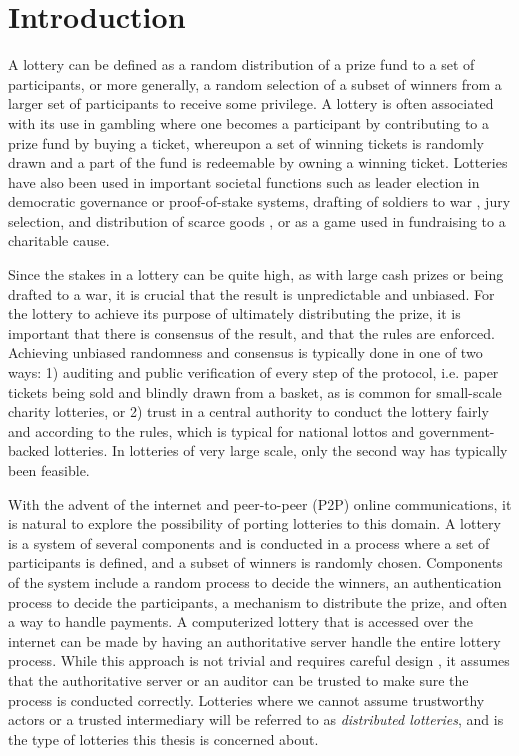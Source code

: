 \chapter{Introduction}
\label{chap:introduction}

A lottery can be defined as a random distribution of a prize fund to a set of participants, or more generally, a random selection of a subset of winners from a larger set of participants to receive some privilege. A lottery is often associated with its use in gambling where one becomes a participant by contributing to a prize fund by buying a ticket, whereupon a set of winning tickets is randomly drawn and a part of the fund is redeemable by owning a winning ticket. Lotteries have also been used in important societal functions such as leader election in democratic governance \cite{sintomer_random_2010} or proof-of-stake systems, drafting of soldiers to war \cite{nixon_executive_1969}, jury selection, and distribution of scarce goods \cite{the_economist_why_2018}, or as a game used in fundraising to a charitable cause. 

Since the stakes in a lottery can be quite high, as with large cash prizes or being drafted to a war, it is crucial that the result is unpredictable and unbiased. For the lottery to achieve its purpose of ultimately distributing the prize, it is important that there is consensus of the result, and that the rules are enforced. Achieving unbiased randomness and consensus is typically done in one of two ways: 1) auditing and public verification of every step of the protocol, i.e. paper tickets being sold and blindly drawn from a basket, as is common for small-scale charity lotteries, or 2) trust in a central authority to conduct the lottery fairly and according to the rules, which is typical for national lottos and government-backed lotteries. In lotteries of very large scale, only the second way has typically been feasible.

With the advent of the internet and peer-to-peer (P2P) online communications, it is natural to explore the possibility of porting lotteries to this domain. A lottery is a system of several components and is conducted in a process where a set of participants is defined, and a subset of winners is randomly chosen. Components of the system include a random process to decide the winners, an authentication process to decide the participants, a mechanism to distribute the prize, and often a way to handle payments.  A computerized lottery that is accessed over the internet can be made by having an authoritative server handle the entire lottery process. While this approach is not trivial and requires careful design \cite{sako_implementation_1999, konstantinou_electronic_2004, konstantinou_trust_2005, chen_design_2005, kuacharoen_design_2012, chen_novel_2016}, it assumes that the authoritative server or an auditor can be trusted to make sure the process is conducted correctly. Lotteries where we cannot assume trustworthy actors or a trusted intermediary will be referred to as \emph{distributed lotteries}, and is the type of lotteries this thesis is concerned about.

